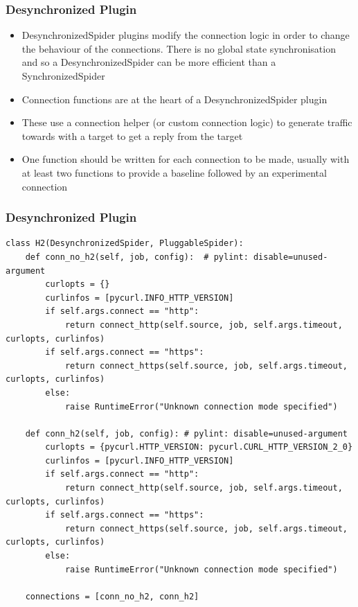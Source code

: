 \documentclass{beamer}
\begin{document}
\begin{frame}
\frametitle{Desynchronized Plugin}
\begin{itemize}[<+->]
\item{DesynchronizedSpider plugins modify the connection logic in order to
change the behaviour of the connections. There is no global state
synchronisation and so a DesynchronizedSpider can be more efficient than a
SynchronizedSpider}
\item{Connection functions are at the heart of a DesynchronizedSpider plugin}
\item{These use a connection helper (or custom connection logic) to generate
traffic towards with a target to get a reply from the target}
\item{One function should be written for each connection to be made, usually
with at least two functions to provide a baseline followed by an experimental
connection}
\end{itemize}
\end{frame}

\begin{frame}[fragile]
\frametitle{Desynchronized Plugin}
\begin{lstlisting}[caption={Connection Functions for the H2 Plugin}]
class H2(DesynchronizedSpider, PluggableSpider):
    def conn_no_h2(self, job, config):  # pylint: disable=unused-argument
        curlopts = {}
        curlinfos = [pycurl.INFO_HTTP_VERSION]
        if self.args.connect == "http":
            return connect_http(self.source, job, self.args.timeout, curlopts, curlinfos)
        if self.args.connect == "https":
            return connect_https(self.source, job, self.args.timeout, curlopts, curlinfos)
        else:
            raise RuntimeError("Unknown connection mode specified")

    def conn_h2(self, job, config): # pylint: disable=unused-argument
        curlopts = {pycurl.HTTP_VERSION: pycurl.CURL_HTTP_VERSION_2_0}
        curlinfos = [pycurl.INFO_HTTP_VERSION]
        if self.args.connect == "http":
            return connect_http(self.source, job, self.args.timeout, curlopts, curlinfos)
        if self.args.connect == "https":
            return connect_https(self.source, job, self.args.timeout, curlopts, curlinfos)
        else:
            raise RuntimeError("Unknown connection mode specified")

    connections = [conn_no_h2, conn_h2]
\end{lstlisting}
\end{frame}
\end{document}
